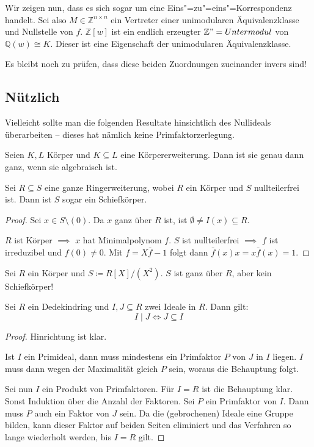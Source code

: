 \documentclass[ngerman, 11pt, a4paper, twoside, abstracton]{scrartcl}
\begin{document}
Wir zeigen nun, dass es sich sogar um eine Eins"=zu"=eins"=Korrespondenz handelt. Sei also $M\in\mathbb{Z}^{n\times n}$ ein Vertreter einer unimodularen Äquivalenzklasse und Nullstelle von $f$. $\mathbb{Z}\left[ w \right]$ ist ein endlich erzeugter $\mathbb{Z}"=Untermodul$ von $\mathbb{Q}\left( w \right)\cong K$. Dieser ist eine Eigenschaft der unimodularen Äquivalenzklasse.

Es bleibt noch zu prüfen, dass diese beiden Zuordnungen zueinander invers sind!

\subsection{Nützlich}

Vielleicht sollte man die folgenden Resultate hinsichtlich des Nullideals überarbeiten -- dieses hat nämlich keine Primfaktorzerlegung.

\begin{lemma}
  Seien $K, L$ Körper und $K\subseteq L$ eine Körpererweiterung. Dann ist sie genau dann ganz, wenn sie algebraisch ist.
\end{lemma}

\begin{lemma}
  Sei $R \subseteq S$ eine ganze Ringerweiterung, wobei $R$ ein Körper und $S$ nullteilerfrei ist. Dann ist $S$ sogar ein Schiefkörper.
\end{lemma}
\begin{proof}
  Sei $x\in S\setminus \left( 0 \right)$. Da $x$ ganz über $R$ ist, ist $\emptyset \ne I\left( x \right) \subseteq R$.
  
  $R$ ist Körper $\implies$ $x$ hat Minimalpolynom $f$. $S$ ist nullteilerfrei $\implies$ $f$ ist irreduzibel und $f\left( 0 \right) \ne 0$. Mit $f = X\bar{f} - 1$ folgt dann $\bar{f}(x) x = x \bar{f}\left( x \right) = 1$.
\end{proof}

\begin{example}
  Sei $R$ ein Körper und $S\coloneqq R\left[ X \right]/\left( X^2 \right)$. $S$ ist ganz über $R$, aber kein Schiefkörper!
\end{example}

\begin{lemma}
  Sei $R$ ein Dedekindring und $I, J \subseteq R$ zwei Ideale in $R$. Dann gilt:
  \[
    I \mid J \iff J \subseteq I
  \]
\end{lemma}
\begin{proof}
  Hinrichtung ist klar.

  Ist $I$ ein Primideal, dann muss mindestens ein Primfaktor $P$ von $J$ in $I$ liegen. $I$ muss dann wegen der Maximalität gleich $P$ sein, woraus die Behauptung folgt.

  Sei nun $I$ ein Produkt von Primfaktoren. Für $I = R$ ist die Behauptung klar. Sonst Induktion über die Anzahl der Faktoren. Sei $P$ ein Primfaktor von $I$. Dann muss $P$ auch ein Faktor von $J$ sein. Da die (gebrochenen) Ideale eine Gruppe bilden, kann dieser Faktor auf beiden Seiten eliminiert und das Verfahren so lange wiederholt werden, bis $I = R$ gilt.
\end{proof}
\end{document}
